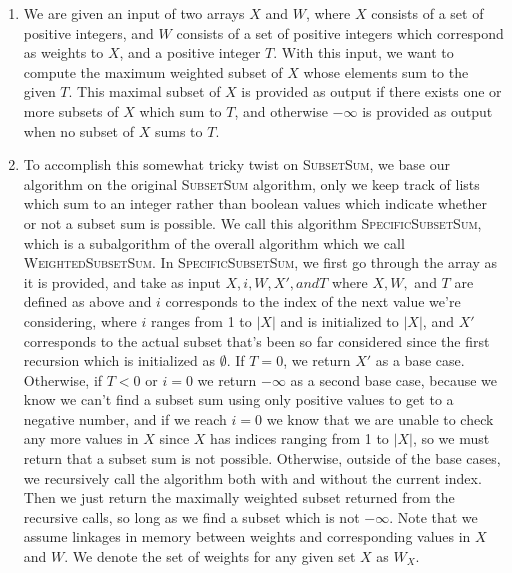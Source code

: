 \documentclass{article}
\begin{document}
\begin{enumerate}
	\item
		We are given an input of two arrays $X$ and $W$, where $X$ consists of a set of positive integers,
		and $W$ consists of a set of positive integers which correspond as weights to $X$, and a positive
		integer $T$. With this input, we want to compute the maximum weighted subset of $X$ whose elements 
		sum to the given $T$. This maximal subset of $X$ is provided as output if there exists one or more
		subsets of $X$ which sum to $T$, and otherwise $-\infty$ is provided as output when no subset of
		$X$ sums to $T$.
	\item
		To accomplish this somewhat tricky twist on \textsc{SubsetSum}, we base our algorithm on the original
		\textsc{SubsetSum} algorithm, only we keep track of lists which sum to an integer rather than boolean
		values which indicate whether or not a subset sum is possible. We call this algorithm 
		\textsc{SpecificSubsetSum}, which is a subalgorithm of the overall algorithm which we call
		\textsc{WeightedSubsetSum}. In \textsc{SpecificSubsetSum}, we first go through the array as it is
		provided, and take as input $X, i, W, X', and T$ where $X, W,$ and $T$ are defined as above and $i$
		corresponds to the index of the next value we're considering, where $i$ ranges from 1 to $|X|$
		and is initialized to $|X|$,
		and $X'$ corresponds to the actual subset that's been so far considered since the first recursion 
		which is initialized as $\emptyset$.
		If $T=0$, we return $X'$  as a base case. Otherwise, if $T<0$ or $i = 0$ we return $-\infty$ as a
		second base case, because we know we can't find a subset sum using only positive values to get to
		a negative number, and if we reach $i=0$ we know that we are unable to check any more values in $X$
		since $X$ has indices ranging from 1 to $|X|$, so we must return that a subset sum is not possible.
		Otherwise, outside of the base cases, we recursively call the algorithm both with and without the
		current index. Then we just return the maximally weighted subset returned from the recursive calls,
		so long as we find a subset which is not $-\infty$. Note that we assume linkages in memory between
		weights and corresponding values in $X$ and $W$. We denote the set of weights for any given set $X$
		as $W_{X}$.


\end{enumerate}
\end{document}
